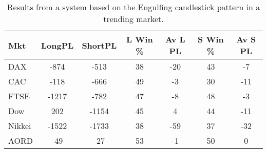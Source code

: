 \begin{table}[ht]
\centering
\caption[Results from a system based on the Engulfing candlestick pattern in a trending market]{Results from a system based on the Engulfing candlestick pattern in a trending market.} 
\label{tab:engulf_aroon_results}
\begin{tabular}{lcccccc}
  \toprule Mkt & LongPL & ShortPL & L Win \% & Av L PL & S Win \% & Av S PL \\ 
  \midrule DAX & -874 & -513 & 38 & -20 & 43 & -7 \\ 
  CAC & -118 & -666 & 49 & -3 & 30 & -11 \\ 
  FTSE & -1217 & -782 & 47 & -8 & 48 & -3 \\ 
  Dow & 202 & -1154 & 45 & 4 & 44 & -11 \\ 
  Nikkei & -1522 & -1733 & 38 & -59 & 37 & -32 \\ 
  AORD & -49 & -27 & 53 & -1 & 50 & 0 \\ 
   \bottomrule \end{tabular}
\end{table}
